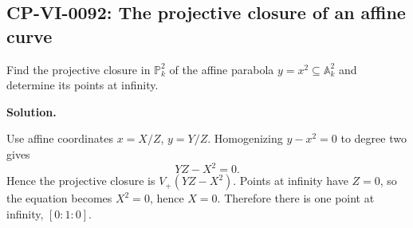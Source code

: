 
\subsection*{CP-VI-0092: The projective closure of an affine curve}

Find the projective closure in $\mathbb P_k^2$ of the affine parabola $y=x^2\subseteq\mathbb A_k^2$ and determine its points at infinity.

\medskip
\noindent\textbf{Solution.}

Use affine coordinates $x=X/Z$, $y=Y/Z$. Homogenizing $y-x^2=0$ to degree two gives
\[
YZ-X^2=0.
\]
Hence the projective closure is $V_+(YZ-X^2)$. Points at infinity have $Z=0$, so the equation becomes $X^2=0$, hence $X=0$. Therefore there is one point at infinity, $[0:1:0]$.
